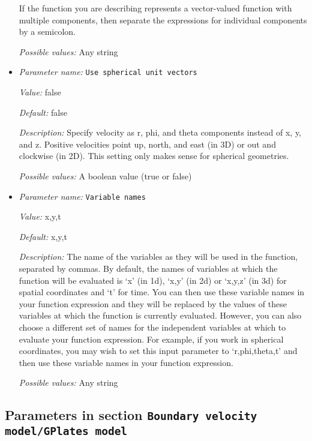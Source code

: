 \begin{itemize}
If the function you are describing represents a vector-valued function with multiple components, then separate the expressions for individual components by a semicolon.


{\it Possible values:} Any string
\item {\it Parameter name:} {\tt Use spherical unit vectors}
\label{parameters:Boundary velocity model/Function/Use spherical unit vectors}


{\it Value:} false


{\it Default:} false


{\it Description:} Specify velocity as r, phi, and theta components instead of x, y, and z. Positive velocities point up, north, and east (in 3D) or out and clockwise (in 2D). This setting only makes sense for spherical geometries.


{\it Possible values:} A boolean value (true or false)
\item {\it Parameter name:} {\tt Variable names}
\label{parameters:Boundary velocity model/Function/Variable names}


{\it Value:} x,y,t


{\it Default:} x,y,t


{\it Description:} The name of the variables as they will be used in the function, separated by commas. By default, the names of variables at which the function will be evaluated is `x' (in 1d), `x,y' (in 2d) or `x,y,z' (in 3d) for spatial coordinates and `t' for time. You can then use these variable names in your function expression and they will be replaced by the values of these variables at which the function is currently evaluated. However, you can also choose a different set of names for the independent variables at which to evaluate your function expression. For example, if you work in spherical coordinates, you may wish to set this input parameter to `r,phi,theta,t' and then use these variable names in your function expression.


{\it Possible values:} Any string
\end{itemize}

\subsection{Parameters in section \tt Boundary velocity model/GPlates model}
\label{parameters:Boundary_20velocity_20model/GPlates_20model}

